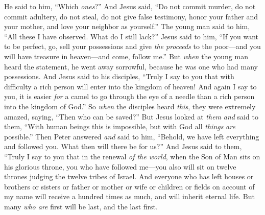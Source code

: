 \begin{biblechapter}
\verse He said to him, “Which \textit{ones}?” And Jesus said, “Do not commit murder, do not commit adultery, do not steal, do not give false testimony,
\verse honor your father and your mother, and love your neighbor as yourself.”
\verse The young man said to him, “All these I have observed. What do I still lack?”
\verse Jesus said to him, “If you want to be perfect, go, sell your possessions and give \textit{the proceeds} to the poor—and you will have treasure in heaven—and come, follow me.”
\verse But \textit{when} the young man heard the statement, he went away sorrowful, because he was one who had many possessions.
\verse And Jesus said to his disciples, “Truly I say to you that with difficulty a rich person will enter into the kingdom of heaven!
\verse And again I say to you, it is easier \textit{for} a camel to go through the eye of a needle than a rich person into the kingdom of God.”
\verse So \textit{when} the disciples heard \textit{this}, they were extremely amazed, saying, “Then who can be saved?”
\verse But Jesus looked at \textit{them} \textit{and} said to them, “With human beings this is impossible, but with God all \textit{things} \textit{are} possible.”
\verse Then Peter answered \textit{and} said to him, “Behold, we have left everything and followed you. What then will there be for us?”
\verse And Jesus said to them, “Truly I say to you that in the renewal \textit{of the world}, when the Son of Man sits on his glorious throne, you who have followed me—you also will sit on twelve thrones judging the twelve tribes of Israel.
\verse And everyone who has left houses or brothers or sisters or father or mother or wife or children or fields on account of my name will receive a hundred times as much, and will inherit eternal life.
\verse But many \textit{who are} first will be last, and the last first.
\end{biblechapter}


